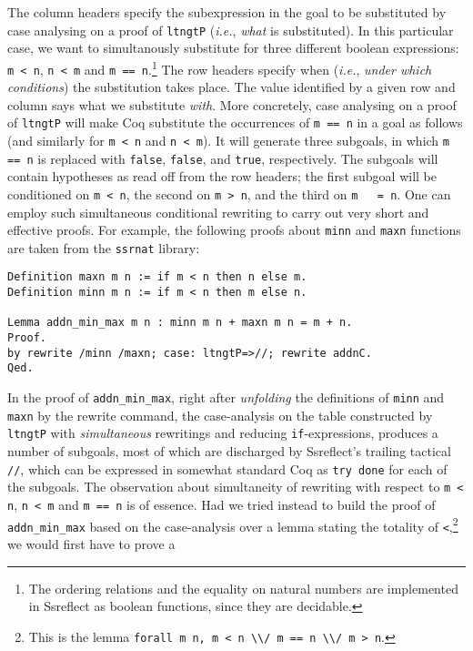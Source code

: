 \documentclass[blockstyle,preprint,nocopyrightspace]{sigplanconf}
\newcommand{\code}[1]{\lstinline{#1}}
\newcommand{\ie}{\emph{i.e.}\xspace}
\begin{document}
\vspace{5pt}
\noindent
The column headers specify the subexpression in the goal to be
substituted by case analysing on a proof of \code{ltngtP} (\ie,
\emph{what} is substituted). In this particular case, we want to
simultanously substitute for three different boolean expressions:
\code{m < n}, \code{n < m} and \code{m == n}.\footnote{The ordering
  relations and the equality on natural numbers are implemented in
  Ssreflect as boolean functions, since they are decidable.}  The row
headers specify when (\ie, \emph{under which conditions}) the
substitution takes place. The value identified by a given row and
column says what we substitute \emph{with}.  More concretely, case
analysing on a proof of \code{ltngtP} will make Coq substitute the
occurrences of \code{m == n} in a goal as follows (and similarly for
\code{m < n} and \code{n < m}). It will generate three subgoals, in
which \code{m == n} is replaced with \code{false}, \code{false}, and
\code{true}, respectively. The subgoals will contain hypotheses as
read off from the row headers; the first subgoal will be conditioned
on \code{m < n}, the second on \code{m > n}, and the third on \code{m
  = n}. One can employ such simultaneous conditional rewriting to
carry out very short and effective proofs. For example, the following
proofs about \code{minn} and \code{maxn} functions are taken from the
\code{ssrnat} library:
%
\begin{lstlisting}
Definition maxn m n := if m < n then n else m.
Definition minn m n := if m < n then m else n.

Lemma addn_min_max m n : minn m n + maxn m n = m + n.
Proof.
by rewrite /minn /maxn; case: ltngtP=>//; rewrite addnC.
Qed.
\end{lstlisting}
%
In the proof of \code{addn_min_max}, right after \emph{unfolding} the
definitions of \code{minn} and \code{maxn} by the rewrite command, the
case-analysis on the table constructed by \code{ltngtP} with
\emph{simultaneous} rewritings and reducing \code{if}-expressions,
produces a number of subgoals, most of which are discharged by
Ssreflect's trailing tactical \code{//}, which can be expressed in
somewhat standard Coq as \code{try done} for each of the subgoals.
%
The observation about simultaneity of rewriting with respect to
\code{m < n}, \code{n < m} and \code{m == n} is of essence. Had we
tried instead to build the proof of \code{addn_min_max} based on the
case-analysis over a lemma stating the totality of
\code{<},\footnote{This is the lemma \code{forall m n, m < n \\/ m == n \\/ m > n}.} we would first have to prove a
\end{document}
